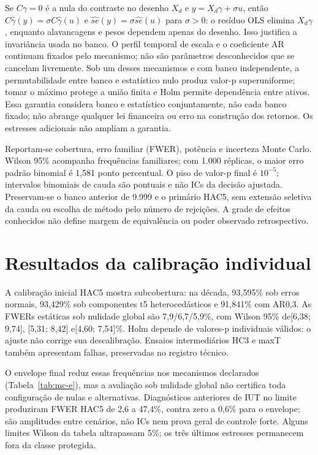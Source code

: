 Se $C\gamma=0$ é a nula do contraste no desenho $X_d $ e
$y=X_d\gamma+\sigma u $, então
$C\widehat\gamma(y)=\sigma C\widehat\gamma(u)$ e
$\widehat{se}(y)=\sigma\widehat{se}(u)$ para $\sigma>0$:
o resíduo OLS elimina $X_d\gamma $, enquanto alavancagens e pesos
dependem apenas do desenho. Isso justifica a invariância usada no banco.
O perfil temporal de escala e o coeficiente AR continuam fixados pelo
mecanismo; não são parâmetros desconhecidos que se cancelam livremente.
Sob um desses mecanismos e com banco independente, a permutabilidade entre
banco e estatístico nulo produz valor-p superuniforme; tomar o máximo
protege a união finita e Holm permite dependência entre ativos.
Essa garantia considera banco e estatístico conjuntamente, não
cada banco fixado; não abrange qualquer lei financeira ou erro na
construção dos retornos. Os estresses adicionais não ampliam a garantia.

Reportam-se cobertura, erro familiar (FWER), potência e incerteza
Monte Carlo. Wilson 95\% acompanha frequências familiares; com 1.000
réplicas, o maior erro padrão binomial é 1,581 ponto percentual.
O piso de valor-p final é $10^{-5}$; intervalos binomiais de cauda
são pontuais e não ICs da decisão ajustada. Preservam-se o banco
anterior de 9.999 e o primário HAC5, sem extensão seletiva da cauda
ou escolha de método pelo número de rejeições. A grade de efeitos
conhecidos não define margem de equivalência ou poder observado
retrospectivo.

\section{Resultados da calibração individual}
\label{sec:calibracao}
A calibração inicial HAC5 mostra subcobertura: na década, 93,595\%
sob erros normais, 93,429\% sob componentes t5 heterocedásticos e
91,841\% com AR0,3. As FWERs estáticas sob nulidade global são
7,9/6,7/5,9\%, com Wilson 95\% de[6,38; 9,74], [5,31; 8,42]
e[4,60; 7,54]\%. Holm depende de valores-p individuais válidos:
o ajuste não corrige sua descalibração. Ensaios intermediários HC3
e maxT também apresentam falhas, preservadas no registro técnico.

O envelope final reduz essas frequências nos mecanismos declarados
(Tabela~\ref{tab:mc-e}), mas a avaliação sob nulidade global não
certifica toda configuração de nulas e alternativas. Diagnósticos
anteriores de IUT no limite produziram FWER HAC5 de 2,6 a 47,4\%,
contra zero a 0,6\% para o envelope; são amplitudes entre cenários,
não ICs nem prova geral de controle forte. Alguns limites Wilson
da tabela ultrapassam 5\%; os três últimos estresses permanecem
fora da classe protegida.


